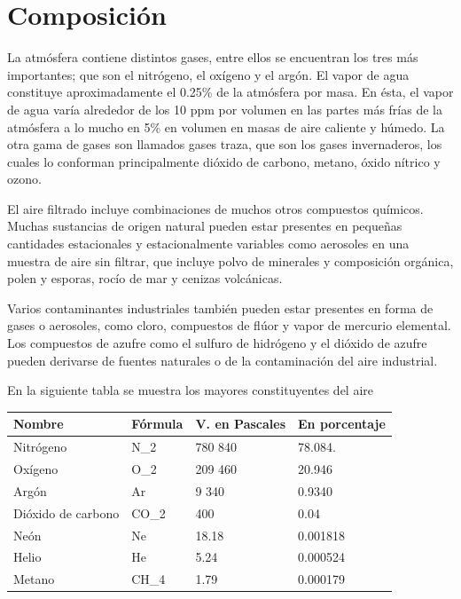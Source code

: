 \documentclass{article} %
\begin{document}
\section{Composición}

La atmósfera contiene distintos gases, entre ellos se encuentran los tres más importantes; que son el nitrógeno, el oxígeno y el argón. El vapor de agua constituye aproximadamente el 0.25\% de la atmósfera por masa. En ésta, el vapor de agua varía alrededor de los 10 ppm por volumen en las partes más frías de la atmósfera a lo mucho en 5\% en volumen en masas de aire caliente y húmedo. La otra gama de gases son llamados gases traza, que son los gases invernaderos, los cuales lo conforman principalmente dióxido de carbono, metano, óxido nítrico y ozono.

El aire filtrado incluye combinaciones de muchos otros compuestos químicos. Muchas sustancias de origen natural pueden estar presentes en pequeñas cantidades estacionales y estacionalmente variables como aerosoles en una muestra de aire sin filtrar, que incluye polvo de minerales y composición orgánica, polen y esporas, rocío de mar y cenizas volcánicas.

Varios contaminantes industriales también pueden estar presentes en forma de gases o aerosoles, como cloro, compuestos de flúor y vapor de mercurio elemental. Los compuestos de azufre como el sulfuro de hidrógeno y el dióxido de azufre pueden derivarse de fuentes naturales o de la contaminación del aire industrial.

En la siguiente tabla se muestra los mayores constituyentes del aire




\begin{center}
    \begin{tabular}{| l | l | l | l |}
    \hline
    Nombre & Fórmula & V. en Pascales & En porcentaje \\ \hline
    Nitrógeno & N_2\ & 780 840 & 78.084. \\ \hline
    Oxígeno & O_2 & 209 460 & 20.946 \\ \hline
    Argón & Ar & 9 340 & 0.9340 \\ \hline
    Dióxido de carbono & CO_2 & 400 & 0.04 \\ \hline
    Neón & Ne & 18.18 & 0.001818 \\ \hline
    Helio & He & 5.24 & 0.000524 \\ \hline
    Metano & CH_4 & 1.79 & 0.000179 \\
    \hline
    \end{tabular}
\end{center}
\end{document}
